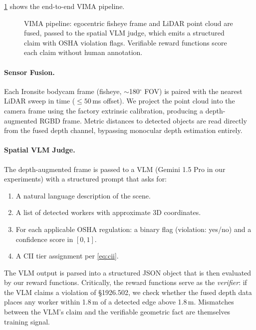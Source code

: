 \documentclass[sigconf,nonacm]{acmart}
\begin{document}
\cref{fig:pipeline} shows the end-to-end VIMA pipeline.

\begin{figure}[t]
  \centering
  \fbox{\rule{0pt}{4cm}\rule{0.9\linewidth}{0pt}}
  \caption{VIMA pipeline: egocentric fisheye frame and LiDAR point
           cloud are fused, passed to the spatial VLM judge, which emits
           a structured claim with OSHA violation flags. Verifiable
           reward functions score each claim without human annotation.}
  \label{fig:pipeline}
\end{figure}

\paragraph{Sensor Fusion.}
Each Ironsite bodycam frame (fisheye, $\sim$180$^\circ$ FOV) is paired
with the nearest LiDAR sweep in time ($\leq 50$\,ms offset).
We project the point cloud into the camera frame using the factory
extrinsic calibration, producing a depth-augmented RGBD frame.
Metric distances to detected objects are read directly from the fused
depth channel, bypassing monocular depth estimation entirely.

\paragraph{Spatial VLM Judge.}
The depth-augmented frame is passed to a VLM (Gemini 1.5 Pro in our
experiments) with a structured prompt that asks for:
\begin{enumerate}
  \item A natural language description of the scene.
  \item A list of detected workers with approximate 3D coordinates.
  \item For each applicable OSHA regulation: a binary flag (violation: yes/no)
        and a confidence score in $[0, 1]$.
  \item A CII tier assignment per \cref{eq:cii}.
\end{enumerate}

The VLM output is parsed into a structured JSON object that is then
evaluated by our reward functions.
Critically, the reward functions serve as the \emph{verifier}: if the VLM
claims a violation of \S1926.502, we check whether the fused depth data
places any worker within 1.8\,m of a detected edge above 1.8\,m.
Mismatches between the VLM's claim and the verifiable geometric fact
are themselves training signal.
\end{document}

